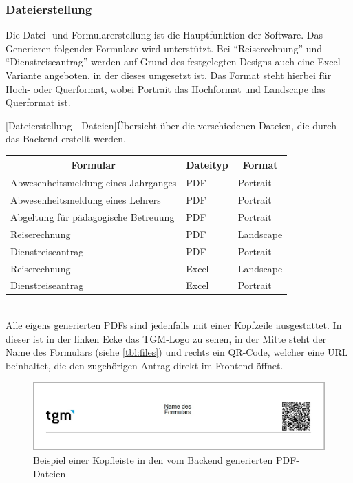 \newpage

\subsubsection{Dateierstellung}

Die Datei- und Formularerstellung ist die Hauptfunktion der Software. Das Generieren folgender Formulare wird unterstützt. Bei \enquote{Reiserechnung} und \enquote{Dienstreiseantrag} werden auf Grund des festgelegten Designs auch eine Excel Variante angeboten, in der dieses umgesetzt ist. Das Format steht hierbei für Hoch- oder Querformat, wobei Portrait das Hochformat und Landscape das Querformat ist.

[Dateierstellung - Dateien]{Übersicht über die verschiedenen Dateien, die durch das Backend erstellt werden.}	
\label{tbl:files}
\begin{table}
	\centering
	\begin{tabular}{|l|l|l|}
		\hline
		\multicolumn{1}{|c|}{\textbf{Formular}} & \multicolumn{1}{c|}{\textbf{Dateityp}} & \multicolumn{1}{c|}{\textbf{Format}} \\ \hline
		Abwesenheitsmeldung eines Jahrganges & PDF & Portrait \\ \hline
		Abwesenheitsmeldung eines Lehrers & PDF & Portrait \\ \hline
		Abgeltung für pädagogische Betreuung & PDF & Portrait \\ \hline
		Reiserechnung & PDF & Landscape \\ \hline
		Dienstreiseantrag & PDF & Portrait \\ \hline
		Reiserechnung & Excel & Landscape \\ \hline
		Dienstreiseantrag & Excel & Portrait \\ \hline
	\end{tabular}
\end{table}

~\\
Alle eigens generierten PDFs sind jedenfalls mit einer Kopfzeile ausgestattet. In dieser ist in der linken Ecke das TGM-Logo zu sehen, in der Mitte steht der Name des Formulars (siehe \autoref{tbl:files}) und rechts ein QR-Code, welcher eine URL beinhaltet, die den zugehörigen Antrag direkt im Frontend öffnet.

\begin{figure}[H]
	\centering
	\includegraphics[width=\linewidth]{images/mbeier_konzept/Kopfleiste_PDF_border}
	\caption[Kopfleiste PDF-Datei]{Beispiel einer Kopfleiste in den vom Backend generierten PDF-Dateien}
	\label{fig:kopfleiste-pdf}
\end{figure}

